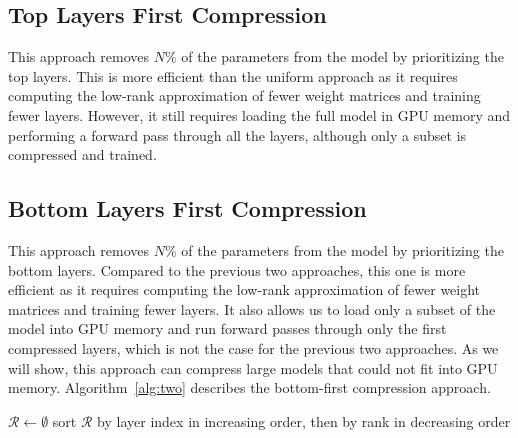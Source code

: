 \subsection{Top Layers First Compression}
This approach removes $N$\% of the parameters from the model by prioritizing the top layers. This is more efficient than the uniform approach as it requires computing the low-rank approximation of fewer weight matrices and training fewer layers. However, it still requires loading the full model in GPU memory and performing a forward pass through all the layers, although only a subset is compressed and trained.

\subsection{Bottom Layers First Compression}
This approach removes $N$\% of the parameters from the model by prioritizing the bottom layers. Compared to the previous two approaches, this one is more efficient as it requires computing the low-rank approximation of fewer weight matrices and training fewer layers. It also allows us to load only a subset of the model into GPU memory and run forward passes through only the first compressed layers, which is not the case for the previous two approaches. As we will show, this approach can compress large models that could not fit into GPU memory. Algorithm~\ref{alg:two} describes the bottom-first compression approach.

\begin{algorithm}[!ht]
\small
\caption{Bottom Layers First Compression Algorithm}\label{alg:two}
$\mathcal{R} \gets \emptyset$\;
sort $\mathcal{R}$ by layer index in increasing order, then by rank in decreasing order\;
\;
\end{algorithm}

